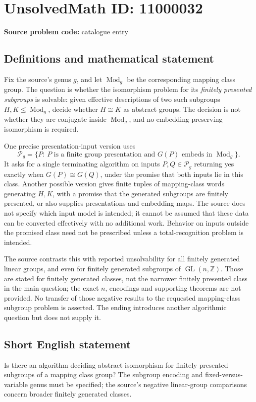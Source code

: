 \documentclass[11pt]{article}
\newcommand{\Z}{\mathbb{Z}}
\begin{document}
\section*{UnsolvedMath ID: 11000032}
\textbf{Source problem code:} catalogue entry
\subsection{Definitions and mathematical statement}
Fix the source's genus \(g\), and let \(\operatorname{Mod}_g\) be the corresponding mapping class group. The question is whether the isomorphism problem for its \emph{finitely presented subgroups} is solvable: given effective descriptions of two such subgroups \(H,K\leq\operatorname{Mod}_g\), decide whether \(H\cong K\) as abstract groups. The decision is not whether they are conjugate inside \(\operatorname{Mod}_g\), and no embedding-preserving isomorphism is required.

One precise presentation-input version uses
\[\mathcal P_g=\{P:\ P\text{ is a finite group presentation and }G(P)\text{ embeds in }\operatorname{Mod}_g\}.\]
It asks for a single terminating algorithm on inputs \(P,Q\in\mathcal P_g\) returning yes exactly when \(G(P)\cong G(Q)\), under the promise that both inputs lie in this class. Another possible version gives finite tuples of mapping-class words generating \(H,K\), with a promise that the generated subgroups are finitely presented, or also supplies presentations and embedding maps. The source does not specify which input model is intended; it cannot be assumed that these data can be converted effectively with no additional work. Behavior on inputs outside the promised class need not be prescribed unless a total-recognition problem is intended.

The source contrasts this with reported unsolvability for all finitely generated linear groups, and even for finitely generated subgroups of \(\operatorname{GL}(n,\Z)\). Those are stated for finitely generated classes, not the narrower finitely presented class in the main question; the exact \(n\), encodings and supporting theorems are not provided. No transfer of those negative results to the requested mapping-class subgroup problem is asserted. The ending introduces another algorithmic question but does not supply it.
\subsection{Short English statement}
Is there an algorithm deciding abstract isomorphism for finitely presented subgroups of a mapping class group? The subgroup encoding and fixed-versus-variable genus must be specified; the source's negative linear-group comparisons concern broader finitely generated classes.
\end{document}
